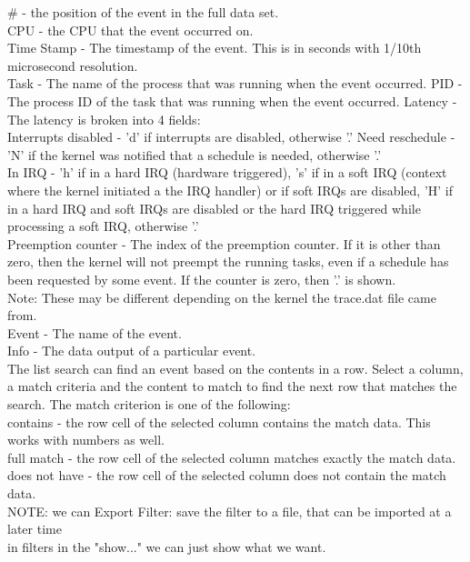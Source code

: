 \documentclass[11pt, a4paper, oneside]{article}
\theoremstyle{definition}
\begin{document}
    $\#$ - the position of the event in the full data set.\\
    CPU - the CPU that the event occurred on.\\
    Time Stamp - The timestamp of the event. This is in seconds with 1/10th microsecond resolution.\\
    Task - The name of the process that was running when the event occurred.
    PID - The process ID of the task that was running when the event occurred.
    Latency - The latency is broken into 4 fields:\\
        Interrupts disabled - 'd' if interrupts are disabled, otherwise '.'
        Need reschedule - 'N' if the kernel was notified that a schedule is needed, otherwise '.'\\
        In IRQ - 'h' if in a hard IRQ (hardware triggered), 's' if in a soft IRQ (context where the kernel initiated a the IRQ handler) or if soft IRQs are disabled, 'H' if in a hard IRQ and soft IRQs are disabled or the hard IRQ triggered while processing a soft IRQ, otherwise '.'\\
        Preemption counter - The index of the preemption counter. If it is other than zero, then the kernel will not preempt the running tasks, even if a schedule has been requested by some event. If the counter is zero, then '.' is shown. \\

    Note: These may be different depending on the kernel the trace.dat file came from.\\
    Event - The name of the event.\\
    Info - The data output of a particular event. \\

The list search can find an event based on the contents in a row. Select a column, a match criteria and the content to match to find the next row that matches the search. The match criterion is one of the following:\\

    contains - the row cell of the selected column contains the match data. This works with numbers as well.\\
    full match - the row cell of the selected column matches exactly the match data.\\
    does not have - the row cell of the selected column does not contain the match data. \\

NOTE: we can Export Filter: save the filter to a file, that can be imported at a later time\\
in filters in the "show..." we can just show what we want.\\
\end{document}
